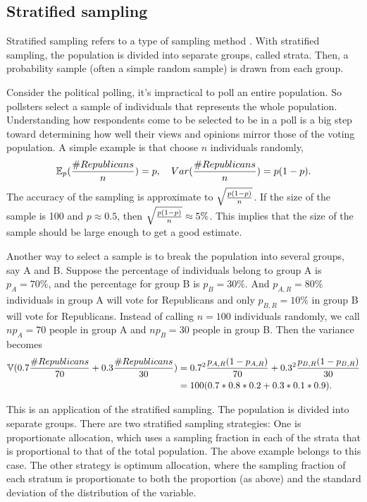 
\subsection{Stratified sampling}
Stratified sampling refers to a type of sampling method . With stratified sampling, the population is divided into separate groups, called strata. Then, a probability sample (often a simple random sample) is drawn from each group.

Consider the political polling, it's impractical to poll an entire population. So pollsters select a sample of individuals that represents the whole population. Understanding how respondents come to be selected to be in a poll is a big step toward determining how well their views and opinions mirror those of the voting population. A simple example is that choose $n$ individuals randomly,
$$
\mathbb{E}_p({\# Republicans \over n})=p, \quad Var({\# Republicans \over n})=p(1-p).
$$
The accuracy of the sampling is approximate to $\sqrt{p(1-p)\over n}$. If the size of the sample is 100 and $p\approx 0.5$, then $\sqrt{p(1-p)\over n}\approx 5\%$. This implies that the size of the sample should be large enough to get a good estimate.

Another way to select a sample is to break the population into several groups, say A and B. Suppose the percentage of individuals belong to group A is $p_A=70\%$, and the percentage for group B is $p_B=30\%$. And $p_{A, R}=80\%$ individuals in group A will vote for Republicans and only $p_{B, R}=10\%$ in group B will vote for Republicans. Instead of calling $n=100$ individuals randomly, we call $np_A=70$ people in group A and $np_B=30$ people in group B. Then the variance becomes
\begin{equation*}
\begin{split}
\mathbb{V}(0.7{\# Republicans \over 70} + 0.3{\# Republicans \over 30})&=0.7^2{p_{A, R}(1-p_{A, R})\over 70} + 0.3^2{p_{B, R}(1-p_{B, R})\over 30}\\
&=100(0.7*0.8*0.2 + 0.3*0.1*0.9).
\end{split}
\end{equation*}

This is an application of the stratified sampling. The population is divided into separate groups. There are two stratified sampling strategies: One is proportionate allocation, which  uses a sampling fraction in each of the strata that is proportional to that of the total population. The above example belongs to this case. The other strategy is 
optimum allocation, where the sampling fraction of each stratum is proportionate to both the proportion (as above) and the standard deviation of the distribution of the variable. 


